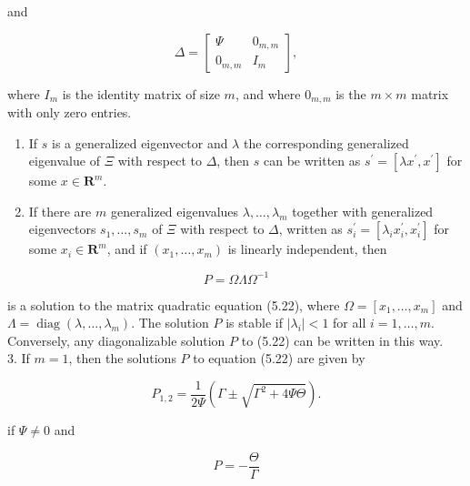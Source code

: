 \documentclass[10pt]{article}
\begin{document}
and

\begin{equation*}
\Delta=\left[\begin{array}{ll}
\Psi & 0_{m, m} \\
0_{m, m} & I_{m}
\end{array}\right],
\end{equation*}

where $I_{m}$ is the identity matrix of size $m$, and where $0_{m, m}$ is the $m \times m$ matrix with only zero entries.

\begin{enumerate}
  \item If $s$ is a generalized eigenvector and $\lambda$ the corresponding generalized eigenvalue of $\Xi$ with respect to $\Delta$, then $s$ can be written as $s^{\prime}=\left[\lambda x^{\prime}, x^{\prime}\right]$ for some $x \in \mathbf{R}^{m}$.
  \item If there are $m$ generalized eigenvalues $\lambda, \ldots, \lambda_{m}$ together with generalized eigenvectors $s_{1}, \ldots, s_{m}$ of $\Xi$ with respect to $\Delta$, written as $s_{i}^{\prime}=\left[\lambda_{i} x_{i}^{\prime}, x_{i}^{\prime}\right]$ for some $x_{i} \in \mathbf{R}^{m}$, and if $\left(x_{1}, \ldots, x_{m}\right)$ is linearly independent, then
\end{enumerate}

\begin{equation*}
P=\Omega \Lambda \Omega^{-1}
\end{equation*}

is a solution to the matrix quadratic equation (5.22), where $\Omega=\left[x_{1}, \ldots, x_{m}\right]$ and $\Lambda=\operatorname{diag}\left(\lambda, \ldots, \lambda_{m}\right)$. The solution $P$ is stable if $\left|\lambda_{i}\right|<1$ for all $i=1, \ldots, m$.\\
Conversely, any diagonalizable solution $P$ to (5.22) can be written in this way.\\
3. If $m=1$, then the solutions $P$ to equation (5.22) are given by

\begin{equation*}
P_{1,2}=\frac{1}{2 \Psi}\left(\Gamma \pm \sqrt{\Gamma^{2}+4 \Psi \Theta}\right) .
\end{equation*}

if $\Psi \neq 0$ and

\begin{equation*}
P=-\frac{\Theta}{\Gamma}
\end{equation*}
\end{document}

